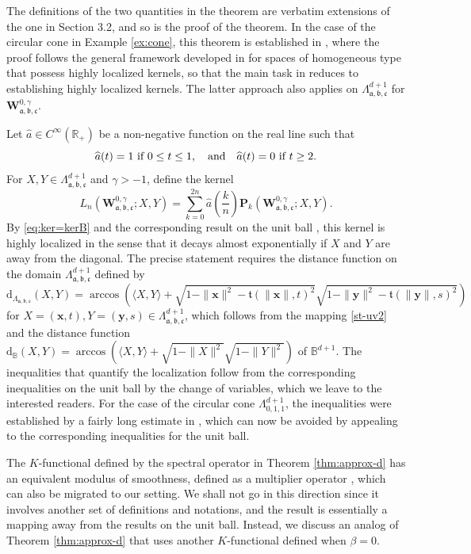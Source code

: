\documentclass{amsart}
\theoremstyle{remark}
\def\la{{\langle}}
\def\ra{{\rangle}}
\def\d{\mathrm{d}}
\def\fa{{\mathfrak a}}
\def\fb{{\mathfrak b}}
\def\fc{{\mathfrak c}}
\def\ft{{\mathfrak t}}
\def\b{{\beta}}
\def\g{{\gamma}}
\def\la{{\langle}}
\def\ra{{\rangle}}
\def\xb{{\mathbf x}}
\def\yb{{\mathbf y}}
\def\Pb{{\mathbf P}}
\def\Wb{{\mathbf W}}
\def\BB{{\mathbb B}}
\def\RR{{\mathbb R}}
\newcommand{\wh}{\widehat}
\def\f{\frac}
\begin{document}
The definitions of the two quantities in the theorem are verbatim extensions of the one in Section 3.2, and 
so is the proof of the theorem. In the case of the circular cone in Example \ref{ex:cone}, this theorem is established
in \cite{X23a}, where the proof follows the general framework developed in \cite{X21} for spaces of homogeneous 
type that possess highly localized kernels, so that the main task in \cite{X23a} reduces to establishing highly 
localized kernels. The latter approach also applies on $\Lambda_{\fa,\fb,\fc}^{d+1}$ for $\Wb_{\fa,\fb,\fc}^{0, \g}$.

Let $\wh a \in C^\infty(\RR_+)$ be a non-negative function on the real line such that
$$
    \wh a(t) =1 \,\,  \hbox{if $0 \le t \le 1$}, \quad \hbox{and} \quad \wh a(t) = 0  \,\,\hbox{if $t \ge 2$}.
$$ 
For $X, Y \in \Lambda_{\fa,\fb,\fc}^{d+1}$ and $\g > -1$, define the kernel
$$
L_n \left( \Wb_{\fa,\fb,\fc}^{0, \g}; X, Y\right) = \sum_{k=0}^{2n} \wh a \left (\f k n \right) \Pb_k \left( \Wb_{\fa,\fb,\fc}^{0, \g}; X,Y\right).
$$
By \eqref{eq:ker=kerB} and the corresponding result on the unit ball \cite{PX}, this kernel is highly localized in the sense 
that it decays almost exponentially if $X$ and $Y$ are away from the diagonal. The precise statement requires the 
distance function on the domain $\Lambda_{\fa,\fb,\fc}^{d+1}$ defined by
$$
  \d_{\Lambda_{\fa,\fb,\fc}}(X,Y) = \arccos \left( \la X, Y\ra + \sqrt{1-\|\xb\|^2- \ft(\|\xb\|, t)^2}\sqrt{1-\|\yb\|^2- \ft(\|\yb\|, s)^2} \right) 
$$
for $X = (\xb,t), Y = (\yb,s)\in \Lambda_{\fa,\fb,\fc}^{d+1}$, which follows from the mapping \eqref{st-uv2} and the distance 
function $\d_\BB(X,Y) = \arccos \left( \la X, Y\ra + \sqrt{1-\|X\|^2}\sqrt{1-\|Y\|^2}\right)$  of $\BB^{d+1}$. The 
inequalities that quantify the localization follow from the corresponding inequalities on the unit ball by the change 
of variables, which we leave to the interested readers. For the case of the circular cone $\Lambda_{0,1,1}^{d+1}$, 
the inequalities were established by a fairly long estimate in \cite{X23a}, which can now be avoided by appealing to the 
corresponding inequalities for the unit ball. 

The $K$-functional defined by the spectral operator in Theorem \ref{thm:approx-d} has an equivalent modulus of 
smoothness, defined as a multiplier operator \cite[Definition 3.9]{X21}, which can also be migrated to our setting.
We shall not go in this direction since it involves another set of definitions and notations, and the result is essentially 
a mapping away from the results on the unit ball. Instead, we discuss an analog of Theorem \ref{thm:approx-d}
that uses another $K$-functional defined when $\b = 0$. 
\end{document}
